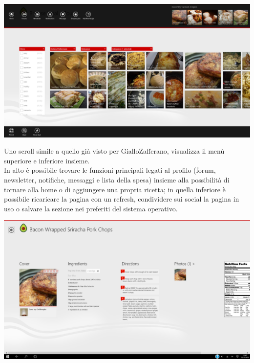 \begin{center}
\includegraphics[scale=0.275] {img/Allthecooks/menu.png}  
\end{center}

Uno scroll simile a quello già visto per GialloZafferano, visualizza il menù superiore e inferiore insieme.\\
In alto è possibile trovare le funzioni principali legati al profilo (forum, newsletter, notifiche, messaggi e lista della spesa) insieme alla possibilità di tornare alla home o di aggiungere una propria ricetta; in quella inferiore è possibile ricaricare la pagina con un refresh, condividere sui social la pagina in uso o salvare la sezione nei preferiti del sistema operativo.\\


\begin{center}
\includegraphics[scale=0.275] {img/Allthecooks/ricetta.png}  
\end{center}


